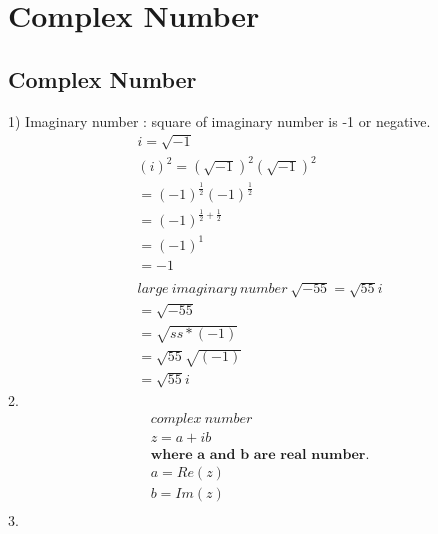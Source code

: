 

\chapter{Complex Number}

\section{Complex Number}
	1) Imaginary number : square of imaginary number is -1 or negative.
	\begin{align}
		i = \sqrt{-1} \\
		(i)^2 = (\sqrt{-1})^2(\sqrt{-1})^2 \\
		= (-1)^\frac{1}{2} (-1)^\frac{1}{2} \\
		= (-1)^{\frac{1}{2}+\frac{1}{2}} \\
		= (-1)^1 \\
		= -1 \\
		\\
		large \ imaginary\ number\ \sqrt{-55} = \sqrt{55}i \\
		=\sqrt{-55} \\
		=\sqrt{ss * (-1)} \\
		=\sqrt{55}\sqrt{(-1)} \\
		=\sqrt{55}i
	\end{align}
	2.
	\begin{align}
		complex \ number \\
		z = a + ib \\
		\textbf{where a and b are real number.} \\
		a = Re(z) \\
		b = Im(z) \\
	\end{align}
	3.

	
	
	
	
	
	
